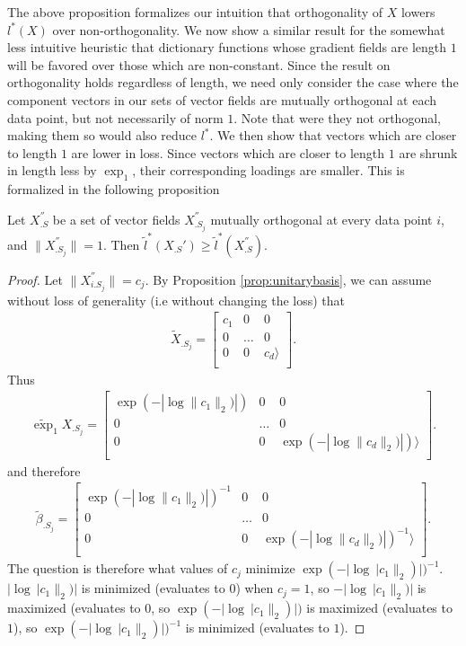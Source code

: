 \documentclass[a4paper,11pt]{article}
\begin{document}
The above proposition formalizes our intuition that orthogonality of $X$ lowers $l^*(X)$ over non-orthogonality.
We now show a similar result for the somewhat less intuitive heuristic that dictionary functions whose gradient fields are length $1$ will be favored over those which are non-constant.
Since the result on orthogonality holds regardless of length, we need only consider the case where the component vectors in our sets of vector fields are mutually orthogonal at each data point, but not necessarily of norm $1$.
Note that were they not orthogonal, making them so would also reduce $l^*$.
We then show that vectors which are closer to length $1$ are lower in loss.
Since vectors which are closer to length $1$ are shrunk in length less by $\exp_1$, their corresponding loadings are smaller.
This is formalized in the following proposition


\begin{proposition}
\label{lemma:orthogonal}
Let $X_{.S}^{''}$ be a set of vector fields $X_{.S_j}^{''}$ mutually orthogonal at every data point $i$, and $\|X_{.S_j}^{''}\| = 1$.
Then $\tilde l^* (X_{.S}' ) \geq \tilde l^*(X_{.S}^{''})$.
\end{proposition}
\begin{proof}
Let $\|X_{i.S_j}^{''}\| = c_j$.  By Proposition \ref{prop:unitarybasis}, we can assume without loss of generality (i.e without changing the loss) that
\begin{eqnarray}
\tilde X_{.S_j} = \begin{bmatrix}
c_1 & 0 & 0 \\
0 & \dots & 0  \\
0 & 0 & c_d  \rangle\\
\end{bmatrix}.
\end{eqnarray}
Thus
\begin{eqnarray}
\tilde \exp_1 X_{.S_j} = \begin{bmatrix}
 \exp (- | \log \|c_1 \|_2)|)  & 0 & 0 \\
0 & \dots & 0  \\
0 & 0 &  \exp (- | \log \|c_d \|_2)|)   \rangle\\
\end{bmatrix}.
\end{eqnarray}
and therefore
\begin{eqnarray}
\tilde \beta_{.S_j} = \begin{bmatrix}
 \exp (- | \log \|c_1 \|_2)|)^{-1}  & 0 & 0 \\
0 & \dots & 0  \\
0 & 0 &  \exp (- | \log \|c_d \|_2)|)^{-1}   \rangle\\
\end{bmatrix}.
\end{eqnarray}
The question is therefore what values of $c_j$ minimize $\exp (- | \log \ |c_1 \|_2)|)^{-1} $.  $| \log \ |c_1 \|_2)|$ is minimized (evaluates to $0$) when $c_j = 1$, so $- | \log \ |c_1 \|_2)|$ is maximized (evaluates to $0$, so $\exp (- | \log \ |c_1 \|_2)|)$ is maximized (evaluates to $1$), so $\exp (- | \log \ |c_1 \|_2)|)^{-1}$ is minimized (evaluates to $1$).
\end{proof}
\end{document}
